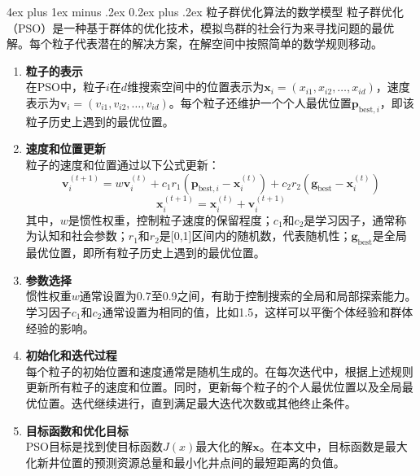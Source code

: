 \documentclass[12pt,a4paper]{nmmcm}
\makeatletter
\renewcommand\subsubsection{\@startsection{subsubsection}{3}{1em}%
  {4ex plus 1ex minus .2ex}%
  {0.2ex plus .2ex}%
  {\normalfont\large\bfseries}}
\makeatother
\begin{document}
\subsubsection{粒子群优化算法的数学模型}
粒子群优化（PSO）是一种基于群体的优化技术，模拟鸟群的社会行为来寻找问题的最优解。每个粒子代表潜在的解决方案，在解空间中按照简单的数学规则移动。

\begin{enumerate}
  \item \textbf{粒子的表示} \\
        在PSO中，粒子$i$在$d$维搜索空间中的位置表示为$\mathbf{x}_i = (x_{i1}, x_{i2}, \ldots, x_{id})$，速度表示为$\mathbf{v}_i = (v_{i1}, v_{i2}, \ldots, v_{id})$。每个粒子还维护一个个人最优位置$\mathbf{p}_{\text{best},i}$，即该粒子历史上遇到的最优位置。

  \item \textbf{速度和位置更新} \\
        粒子的速度和位置通过以下公式更新：
        \[
          \mathbf{v}_i^{(t+1)} = w \mathbf{v}_i^{(t)} + c_1 r_1 (\mathbf{p}_{\text{best},i} - \mathbf{x}_i^{(t)}) + c_2 r_2 (\mathbf{g}_{\text{best}} - \mathbf{x}_i^{(t)})
        \]
        \[
          \mathbf{x}_i^{(t+1)} = \mathbf{x}_i^{(t)} + \mathbf{v}_i^{(t+1)}
        \]
        其中，$w$是惯性权重，控制粒子速度的保留程度；$c_1$和$c_2$是学习因子，通常称为认知和社会参数；$r_1$和$r_2$是[0,1]区间内的随机数，代表随机性；$\mathbf{g}_{\text{best}}$是全局最优位置，即所有粒子历史上遇到的最优位置。

  \item \textbf{参数选择} \\
        惯性权重$w$通常设置为0.7至0.9之间，有助于控制搜索的全局和局部探索能力。学习因子$c_1$和$c_2$通常设置为相同的值，比如1.5，这样可以平衡个体经验和群体经验的影响。

  \item \textbf{初始化和迭代过程} \\
        每个粒子的初始位置和速度通常是随机生成的。在每次迭代中，根据上述规则更新所有粒子的速度和位置。同时，更新每个粒子的个人最优位置以及全局最优位置。迭代继续进行，直到满足最大迭代次数或其他终止条件。

  \item \textbf{目标函数和优化目标} \\
        PSO目标是找到使目标函数$J(x)$最大化的解$\mathbf{x}$。在本文中，目标函数是最大化新井位置的预测资源总量和最小化井点间的最短距离的负值。
\end{enumerate}
\end{document}
